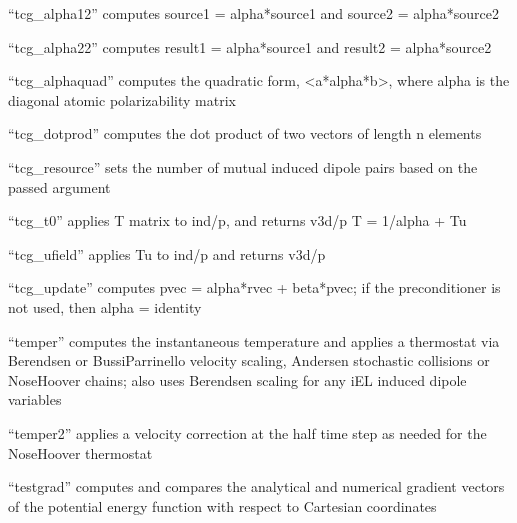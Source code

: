 \documentclass[letterpaper,11pt,english]{sphinxmanual}
\begin{document}

“tcg\_alpha12” computes source1 = alpha*source1 and
source2 = alpha*source2


“tcg\_alpha22” computes result1 = alpha*source1 and
result2 = alpha*source2


“tcg\_alphaquad” computes the quadratic form, \textless{}a*alpha*b\textgreater{},
where alpha is the diagonal atomic polarizability matrix


“tcg\_dotprod” computes the dot product of two vectors
of length n elements


“tcg\_resource” sets the number of mutual induced dipole
pairs based on the passed argument


“tcg\_t0” applies T matrix to ind/p, and returns v3d/p
T = 1/alpha + Tu


“tcg\_ufield” applies \sphinxhyphen{}Tu to ind/p and returns v3d/p


“tcg\_update” computes pvec = alpha*rvec + beta*pvec;
if the preconditioner is not used, then alpha = identity


“temper” computes the instantaneous temperature and applies a
thermostat via Berendsen or Bussi\sphinxhyphen{}Parrinello velocity scaling,
Andersen stochastic collisions or Nose\sphinxhyphen{}Hoover chains; also uses
Berendsen scaling for any iEL induced dipole variables


“temper2” applies a velocity correction at the half time step
as needed for the Nose\sphinxhyphen{}Hoover thermostat


“testgrad” computes and compares the analytical and numerical
gradient vectors of the potential energy function with respect
to Cartesian coordinates
\end{document}
